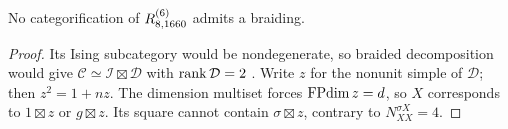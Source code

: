 \begin{corollary}\label{cor:1660-no-braiding}
No categorification of $R^{(6)}_{8,1660}$ admits a braiding.
\end{corollary}
\begin{proof}
Its Ising subcategory would be nondegenerate, so braided decomposition
would give $\mathcal C\simeq\mathcal I\boxtimes\mathcal D$ with
$\operatorname{rank}\mathcal D=2$ \cite[Corollary~B.12 and Theorem~3.13]{DGNO}.
Write $z$ for the nonunit simple of $\mathcal D$; then
$z^2=1+nz$. The dimension multiset forces $\operatorname{FPdim} z=d$, so
$X$ corresponds to $1\boxtimes z$ or $g\boxtimes z$.
Its square cannot contain $\sigma\boxtimes z$, contrary to
$N_{XX}^{\sigma X}=4$.
\end{proof}
